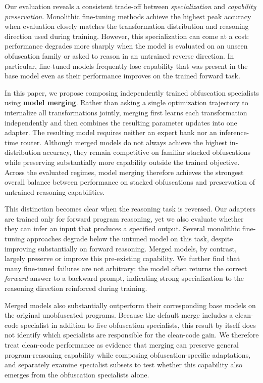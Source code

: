 Our evaluation reveals a consistent trade-off between
\emph{specialization} and \emph{capability preservation}. Monolithic
fine-tuning methods achieve the highest peak accuracy when evaluation closely
matches the transformation distribution and reasoning direction used during
training. However, this specialization can come at a cost: performance
degrades more sharply when the model is evaluated on an unseen obfuscation
family or asked to reason in an untrained reverse direction. In particular,
fine-tuned models frequently lose capability that was present in the base
model even as their performance improves on the trained forward task.

In this paper, we propose composing independently trained obfuscation
specialists using {\bf model merging}. Rather than asking a single
optimization trajectory to internalize all transformations jointly, merging
first learns each transformation independently and then combines the resulting
parameter updates into one adapter. The resulting model requires neither an
expert bank nor an inference-time router. Although merged models do not always
achieve the highest in-distribution accuracy, they remain competitive on
familiar stacked obfuscations while preserving substantially more capability
outside the trained objective. Across the evaluated regimes, model merging
therefore achieves the strongest overall balance between performance on stacked
obfuscations and preservation of untrained reasoning capabilities.

This distinction becomes clear when the reasoning task is
reversed. Our adapters are trained only for forward program reasoning, yet we
also evaluate whether they can infer an input that produces a specified output.
Several monolithic fine-tuning approaches degrade below the untuned model on
this task, despite improving substantially on forward reasoning. Merged models,
by contrast, largely preserve or improve this pre-existing capability. We
further find that many fine-tuned failures are not arbitrary: the model often
returns the correct \emph{forward} answer to a backward prompt, indicating
strong specialization to the reasoning direction reinforced during training.

Merged models also substantially outperform their corresponding base models
on the original unobfuscated programs. Because the default merge includes a
clean-code specialist in addition to five obfuscation specialists, this result
by itself does not identify which specialists are responsible for the clean-code
gain. We therefore treat clean-code performance as evidence that merging can
preserve general program-reasoning capability while composing
obfuscation-specific adaptations, and separately examine specialist subsets to
test whether this capability also emerges from the obfuscation specialists
alone.

